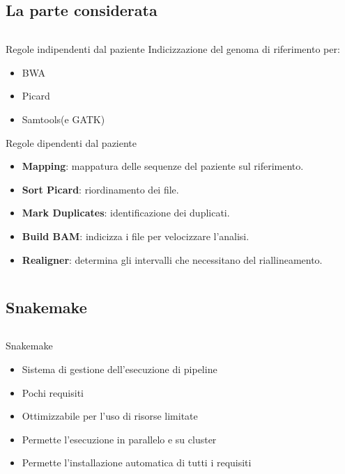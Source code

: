 \documentclass{beamer}
\begin{document}
\subsection{La parte considerata}
\begin{frame}
\begin{columns}
\begin{column}{0.8\linewidth}
\begin{block}{Regole indipendenti dal paziente}
Indicizzazione del genoma di riferimento per:
\begin{itemize}
\item BWA
\item Picard
\item Samtools(e GATK) 
\end{itemize}
\end{block}
\begin{block}{Regole dipendenti dal paziente}
\begin{itemize}
\item \textbf{Mapping}: mappatura delle sequenze del paziente sul riferimento.
\item \textbf{Sort Picard}: riordinamento dei file. 
\item \textbf{Mark Duplicates}: identificazione dei duplicati.
\item \textbf{Build BAM}: indicizza i file per velocizzare l'analisi.
\item \textbf{Realigner}: determina gli intervalli che necessitano del riallineamento.
\end{itemize}
\end{block}
\end{column}
\end{columns}
\end{frame}

\subsection{Snakemake}
\begin{frame}
\begin{columns}
\begin{column}{0.8\linewidth}
\begin{block}{Snakemake}
\begin{itemize}
\item Sistema di gestione dell'esecuzione di pipeline
\item Pochi requisiti 
\item Ottimizzabile per l'uso di risorse limitate
\item Permette l'esecuzione in parallelo e su cluster
\item Permette l'installazione automatica di tutti i requisiti
\end{itemize}
\end{block}
\end{column}
\end{columns}
\end{frame}
\end{document}
